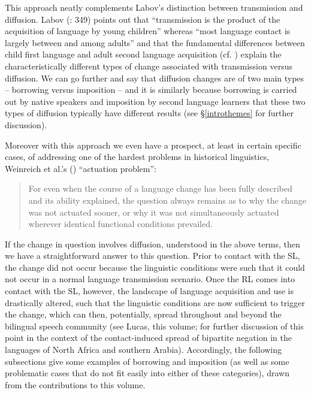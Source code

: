 \documentclass[output=paper]{langsci/langscibook}
\begin{document}
This approach neatly complements Labov's distinction between {transmission} and {diffusion}. Labov (\citeyear{Labov2007}: 349) points out that ``{transmission} is the product of the acquisition of language by young children'' whereas ``most language contact is largely between and among adults'' and that the fundamental differences between child first language and adult second language acquisition (cf. \citealt{BleyVroman1989,BleyVroman2009,Meisel2011}) explain the characteristically different types of change associated with {transmission} versus {diffusion}. We can go further and say that {diffusion} changes are of two main types -- borrowing versus {imposition} -- and it is similarly because borrowing is carried out by native speakers and {imposition} by second language learners that these two types of {diffusion} typically have different results (see §\ref{introthemes} for further discussion).

Moreover with this approach we even have a prospect, at least in certain specific cases, of addressing one of the hardest problems in historical linguistics, Weinreich et al.'s  (\citeyear{WeinreichLabovHerzog1968}) ``{actuation} problem'':

\begin{quote}
For even when the course of a  {language change} has been fully described and its ability explained, the question always remains as to why the change was not {actuated} sooner, or why it was not simultaneously {actuated} wherever identical functional conditions prevailed. \citep[112]{WeinreichLabovHerzog1968}
\end{quote}

\noindent If the change in question involves {diffusion}, understood in the above terms, then we have a straightforward answer to this question. Prior to contact with the {SL}, the change did not occur because the linguistic conditions were such that it could not occur in a normal language {transmission} scenario. Once the {RL} comes into contact with the {SL}, however, the landscape of language acquisition and use is drastically altered, such that the linguistic conditions are now sufficient to trigger the change, which can then, potentially, spread throughout and beyond the bilingual {speech community} (see Lucas, this volume; \citealt{LucasLash2010} for further discussion of this point in the context of the contact-induced spread of bipartite {negation} in the languages of North Africa and southern Arabia). Accordingly, the following subsections give some examples of borrowing and {imposition} (as well as some problematic cases that do not fit easily into either of these categories), drawn from the contributions to this volume.
\end{document}
